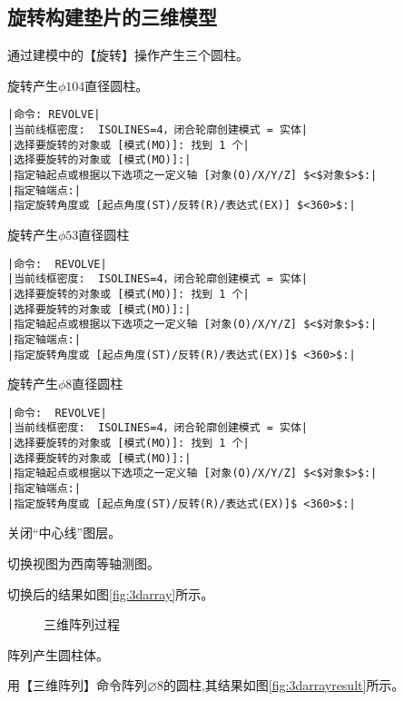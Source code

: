 \subsection{旋转构建垫片的三维模型}
\begin{procedure}
\item 通过建模中的【旋转】操作产生三个圆柱。

旋转产生$\phi 104$直径圆柱。
\begin{lstlisting}
|命令: REVOLVE|
|当前线框密度:  ISOLINES=4，闭合轮廓创建模式 = 实体|
|选择要旋转的对象或 [模式(MO)]: 找到 1 个|
|选择要旋转的对象或 [模式(MO)]:|
|指定轴起点或根据以下选项之一定义轴 [对象(O)/X/Y/Z] $<$对象$>$:|
|指定轴端点:|
|指定旋转角度或 [起点角度(ST)/反转(R)/表达式(EX)] $<360>$:|
\end{lstlisting}
旋转产生$\phi 53$直径圆柱
\begin{lstlisting}
|命令:  REVOLVE|
|当前线框密度:  ISOLINES=4，闭合轮廓创建模式 = 实体|
|选择要旋转的对象或 [模式(MO)]: 找到 1 个|
|选择要旋转的对象或 [模式(MO)]:|
|指定轴起点或根据以下选项之一定义轴 [对象(O)/X/Y/Z] $<$对象$>$:|
|指定轴端点:|
|指定旋转角度或 [起点角度(ST)/反转(R)/表达式(EX)]$ <360>$:|
\end{lstlisting}
旋转产生$\phi 8$直径圆柱
\begin{lstlisting}
|命令:  REVOLVE|
|当前线框密度:  ISOLINES=4，闭合轮廓创建模式 = 实体|
|选择要旋转的对象或 [模式(MO)]: 找到 1 个|
|选择要旋转的对象或 [模式(MO)]:|
|指定轴起点或根据以下选项之一定义轴 [对象(O)/X/Y/Z] $<$对象$>$:|
|指定轴端点:|
|指定旋转角度或 [起点角度(ST)/反转(R)/表达式(EX)]$ <360>$:|
\end{lstlisting}
\item 关闭“中心线”图层。
\item 切换视图为西南等轴测图。

切换后的结果如图\ref{fig:3darray}所示。
\begin{figure}[htbp]
\centering
{}\hspace{30pt}
\hspace{30pt}
\caption{三维阵列过程}
\end{figure}
\item 阵列产生圆柱体。

用【三维阵列】命令阵列$\diameter 8$的圆柱,其结果如图\ref{fig:3darrayresult}所示。


\end{procedure}
